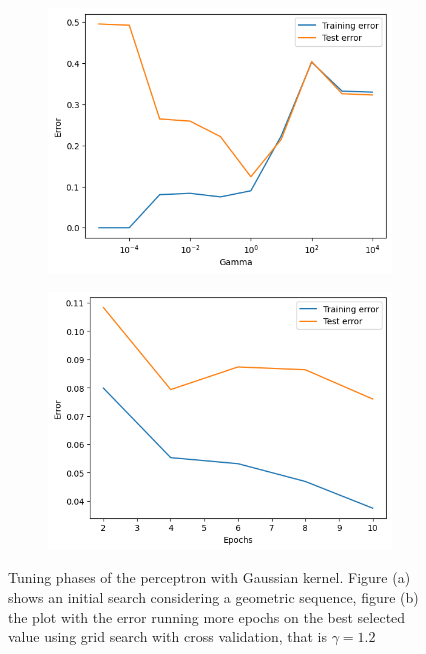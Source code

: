 \documentclass{article}
\begin{document}
\begin{figure}
	\centering
	\begin{subfigure}{0.45\columnwidth}
		\centering
		\includegraphics[width=\columnwidth]{../plots/kgauss_perceptron.png}
		\caption{}
		\label{subfig:kgauss_perceptron}
	\end{subfigure}
	\begin{subfigure}{0.45\columnwidth}
		\centering
		\includegraphics[width=\columnwidth]{../plots/kgauss2_perceptron.png}
		\caption{}
		\label{subfig:kgauss2_perceptron}
	\end{subfigure}
	\caption{Tuning phases of the perceptron with Gaussian kernel. Figure (a) shows an initial search considering a geometric sequence, figure (b) the plot with the error running more epochs on the best selected value using grid search with cross validation, that is $\gamma=1.2$}
	\label{fig:kgauss_perceptron}
\end{figure}
\end{document}
